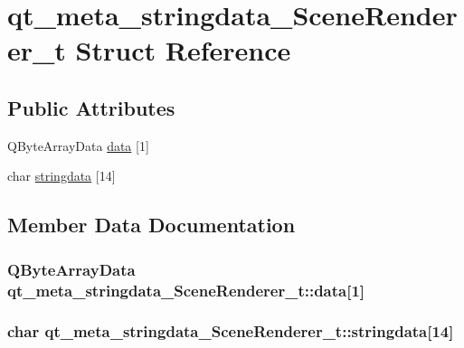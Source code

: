 \hypertarget{structqt__meta__stringdata___scene_renderer__t}{\section{qt\+\_\+meta\+\_\+stringdata\+\_\+\+Scene\+Renderer\+\_\+t Struct Reference}
\label{structqt__meta__stringdata___scene_renderer__t}
}
\subsection*{Public Attributes}
\begin{DoxyCompactItemize}
\item 
Q\+Byte\+Array\+Data \hyperlink{structqt__meta__stringdata___scene_renderer__t_a400433d6320ae07abf8d159740d9e08e}{data} \mbox{[}1\mbox{]}
\item 
char \hyperlink{structqt__meta__stringdata___scene_renderer__t_a52c301c29502c30eee2f35aab1764572}{stringdata} \mbox{[}14\mbox{]}
\end{DoxyCompactItemize}


\subsection{Member Data Documentation}
\hypertarget{structqt__meta__stringdata___scene_renderer__t_a400433d6320ae07abf8d159740d9e08e}{
\subsubsection[{data}]{\setlength{\rightskip}{0pt plus 5cm}Q\+Byte\+Array\+Data qt\+\_\+meta\+\_\+stringdata\+\_\+\+Scene\+Renderer\+\_\+t\+::data\mbox{[}1\mbox{]}}}\label{structqt__meta__stringdata___scene_renderer__t_a400433d6320ae07abf8d159740d9e08e}
\hypertarget{structqt__meta__stringdata___scene_renderer__t_a52c301c29502c30eee2f35aab1764572}{
\subsubsection[{stringdata}]{\setlength{\rightskip}{0pt plus 5cm}char qt\+\_\+meta\+\_\+stringdata\+\_\+\+Scene\+Renderer\+\_\+t\+::stringdata\mbox{[}14\mbox{]}}}\label{structqt__meta__stringdata___scene_renderer__t_a52c301c29502c30eee2f35aab1764572}


